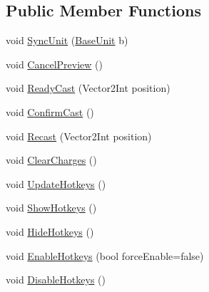 \subsection*{Public Member Functions}
\begin{DoxyCompactItemize}
\item 
void \mbox{\hyperlink{class_hotbar_a1e796a0a133ee0743aa8585c05980f9b}{Sync\+Unit}} (\mbox{\hyperlink{class_base_unit}{Base\+Unit}} b)
\item 
void \mbox{\hyperlink{class_hotbar_a0c213365074f45fd1b1010eabe3f3d4d}{Cancel\+Preview}} ()
\item 
void \mbox{\hyperlink{class_hotbar_a5ac379c585126b8e0e35c061b3388ecf}{Ready\+Cast}} (Vector2\+Int position)
\item 
void \mbox{\hyperlink{class_hotbar_a535ef71789d10c417b86bdd194e3e5b7}{Confirm\+Cast}} ()
\item 
void \mbox{\hyperlink{class_hotbar_acda305961d329d3b329dbe4247539ef5}{Recast}} (Vector2\+Int position)
\item 
void \mbox{\hyperlink{class_hotbar_ab54a6d27db19b4ed21014a782d74b3d1}{Clear\+Charges}} ()
\item 
void \mbox{\hyperlink{class_hotbar_a1b1cab633f4bf2347af2c0f04fa4b856}{Update\+Hotkeys}} ()
\item 
void \mbox{\hyperlink{class_hotbar_a989b6728a8d86d60a851f68954edab90}{Show\+Hotkeys}} ()
\item 
void \mbox{\hyperlink{class_hotbar_a2f8af9863292223ae00d361121164160}{Hide\+Hotkeys}} ()
\item 
void \mbox{\hyperlink{class_hotbar_a37bca03a1dfd144a30bae3774eaab667}{Enable\+Hotkeys}} (bool force\+Enable=false)
\item 
void \mbox{\hyperlink{class_hotbar_a914ca0c61c4d64b0bde6e829064f71a9}{Disable\+Hotkeys}} ()
\end{DoxyCompactItemize}

